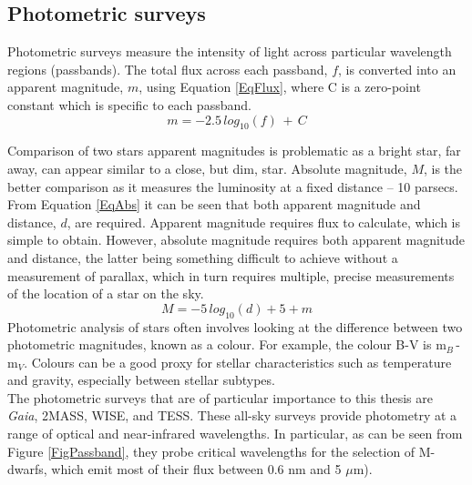\subsection{Photometric surveys}
\label{SecPhotSurveys}
Photometric surveys measure the intensity of light across particular wavelength regions (passbands). The total flux across each passband, $f$, is converted into an apparent magnitude, $m$, using Equation \ref{EqFlux}, where C is a zero-point constant which is specific to each passband.\\
\begin{equation}
m = -2.5\,log_{10}(f)\,+\,C
\label{EqFlux}
\end{equation}

Comparison of two stars apparent magnitudes is problematic as a bright star, far away, can appear similar to a close, but dim, star. Absolute magnitude, $M$, is the better comparison as it measures the luminosity at a fixed distance -- 10 parsecs. From Equation \ref{EqAbs} it can be seen that both apparent magnitude and distance, $d$, are required. Apparent magnitude requires flux to calculate, which is simple to obtain. However, absolute magnitude requires both apparent magnitude and distance, the latter being something difficult to achieve without a measurement of parallax, which in turn requires multiple, precise measurements of the location of a star on the sky.\\
\begin{equation}
M = -5\,log_{10}(d) + 5 + m
\label{EqAbs}
\end{equation}
Photometric analysis of stars often involves looking at the difference between two photometric magnitudes, known as a colour. For example, the colour B-V is m$_B$\,-\,m$_V$. Colours can be a good proxy for stellar characteristics such as temperature and gravity, especially between stellar subtypes.\\

The photometric surveys that are of particular importance to this thesis are {\em Gaia}, 2MASS, WISE, and TESS. These all-sky surveys provide photometry at a range of optical and near-infrared wavelengths. In particular, as can be seen from Figure \ref{FigPassband}, they probe critical wavelengths for the selection of M-dwarfs, which emit most of their flux between 0.6 nm and 5 $\mu$m).\\

